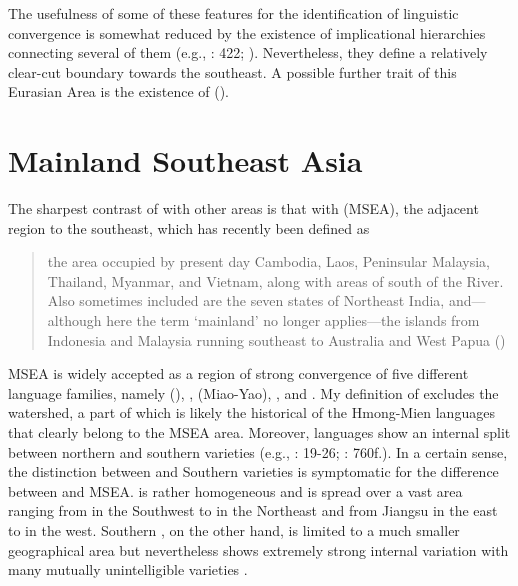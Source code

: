 The usefulness of some of these  features for the identification of linguistic convergence is somewhat reduced by the existence of implicational hierarchies connecting several of them (e.g., \citealt{Bisang2010}: 422; \citealt{Dryer2013a}). Nevertheless, they define a relatively clear-cut boundary towards the southeast. A possible further trait of this Eurasian Area is the existence of  ().

\section{Mainland Southeast Asia}\label{sec:3.3}

The sharpest contrast of  with other areas is that with  (MSEA), the adjacent region to the southeast, which has recently been defined as

\begin{quote}
the area occupied by present day Cambodia, Laos, Peninsular Malaysia, Thailand, Myanmar, and Vietnam, along with areas of  south of the  River. Also sometimes included are the seven states of Northeast India, and—although here the term ‘mainland’ no longer applies—the islands from Indonesia and Malaysia running southeast to Australia and West Papua (\citealt[1]{EnfieldComrie2015})
\end{quote}

\noindent MSEA is widely accepted as a region of strong convergence of five different language families, namely  (), ,  (Miao-Yao), , and . My definition of  excludes the  watershed, a part of which is likely the historical  of the Hmong-Mien languages \citep[241]{Ratliff2010} that clearly belong to the MSEA area. Moreover,  languages show an internal split between northern and southern varieties (e.g., \citealt{Ramsey1987}: 19-26; \citealt{Matthews2010}: 760f.). In a certain sense, the distinction between  and Southern  varieties is symptomatic for the difference between  and MSEA.  is rather homogeneous and is spread over a vast area ranging from  in the Southwest to  in the Northeast and from Jiangsu in the east to  in the west. Southern , on the other hand, is limited to a much smaller geographical area but nevertheless shows extremely strong internal variation with many mutually unintelligible varieties \citep{Kurpaska2010}.

